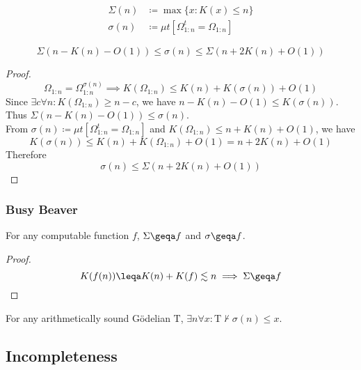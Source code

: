 \documentclass[UTF8,aspectratio=43,11pt,colorlinks,compress,openany]{beamer}%
\begin{document}
\begin{frame}\frametitle{}
\setlength\abovedisplayskip{0pt}
\setlength\belowdisplayskip{0pt}
	\begin{definition}
		\begin{align*}
		\Sigma(n)&\coloneqq \max\{x: K(x)\leq n\}\\
		\sigma(n)&\coloneqq \mu t\left[\Omega^t_{1:n}=\Omega_{1:n}\right]
		\end{align*}
	\end{definition}
	\begin{lemma}
		\[\Sigma(n-K(n)-O(1))\leq \sigma(n)\leq\Sigma(n+2K(n)+O(1))\]
	\end{lemma}
	\begin{proof}
		\[\Omega_{1:n}=\Omega^{\sigma(n)}_{1:n}\implies K(\Omega_{1:n})\leq K(n)+K(\sigma(n))+O(1)\]
		Since $\exists c\forall n: K(\Omega_{1:n})\geq n-c$, we have $n-K(n)-O(1)\leq K(\sigma(n))$.\\
		Thus $\Sigma(n-K(n)-O(1))\leq \sigma(n)$.\\
		From $\sigma(n)\coloneqq \mu t\left[\Omega^t_{1:n}=\Omega_{1:n}\right]$ and $K(\Omega_{1:n})\leq n+K(n)+O(1)$, we have \[K(\sigma(n))\leq K(n)+K(\Omega_{1:n})+O(1)=n+2K(n)+O(1)\]
		Therefore
		\[\sigma(n)\leq\Sigma(n+2K(n)+O(1))\]
	\end{proof}
\end{frame}

\begin{frame}\frametitle{Busy Beaver}
	\begin{lemma}
		For any computable function $f$, $\Sigma\geqa f$ and $\sigma\geqa f$.
	\end{lemma}
	\begin{proof}
		\[K(f(n))\leqa K(n)+K(f)\lesssim n\implies
		\Sigma\geqa f\]
	\end{proof}
	\begin{theorem}
		For any arithmetically sound G\"odelian $\mathrm{T}$, $\exists n\forall x:\mathrm{T}\nvdash \sigma(n)\leq x$.
	\end{theorem}
\end{frame}

\subsection{Incompleteness}
\end{document}
